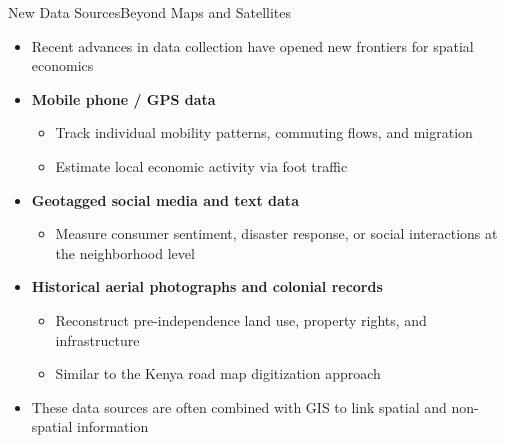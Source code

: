 \documentclass[dvipsnames,hyperref={pdfpagelabels=false}]{beamer}
\begin{document}
\begin{frame}{New Data Sources}{Beyond Maps and Satellites}
\begin{itemize}
	\item Recent advances in data collection have opened new frontiers for spatial economics
	\vspace{0.2cm}
	\item \textbf{Mobile phone / GPS data}
	\begin{itemize}
		\vspace{0.1cm}
		\item Track individual mobility patterns, commuting flows, and migration
		\vspace{0.1cm}
		\item Estimate local economic activity via foot traffic
	\end{itemize}
	\vspace{0.2cm}
	\item \textbf{Geotagged social media and text data}
	\begin{itemize}
		\vspace{0.1cm}
		\item Measure consumer sentiment, disaster response, or social interactions at the neighborhood level
	\end{itemize}
	\vspace{0.2cm}
	\item \textbf{Historical aerial photographs and colonial records}
	\begin{itemize}
		\vspace{0.1cm}
		\item Reconstruct pre-independence land use, property rights, and infrastructure
		\vspace{0.1cm}
		\item Similar to the Kenya road map digitization approach
	\end{itemize}
	\vspace{0.2cm}
	\item These data sources are often combined with GIS to link spatial and non-spatial information
\end{itemize}
\end{frame}
\end{document}
